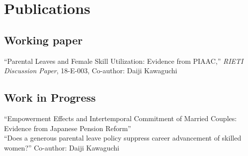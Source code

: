 \documentclass[11pt, a4paper]{article} %
\newcommand{\years}[1]{\marginnote{\scriptsize #1}} %
\begin{document}

\section*{Publications}







\subsection*{Working paper}

\years{2018} ``Parental Leaves and Female Skill Utilization: Evidence from PIAAC,'' \textit{RIETI Discussion Paper}, 18-E-003, Co-author: Daiji Kawaguchi



\subsection*{Work in Progress}

\years{} ``Empowerment Effects and Intertemporal Commitment of Married Couples: Evidence from Japanese Pension Reform''\\
\years{} ``Does a generous parental leave policy suppress career advancement of skilled women?'' Co-author: Daiji Kawaguchi

\end{document}
